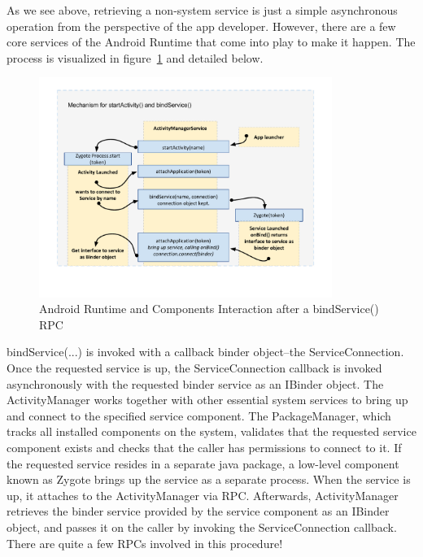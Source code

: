\documentclass[prodmode]{acmlarge}
\begin{document}
As we see above, retrieving a non-system service is just a simple asynchronous operation from the perspective of the app developer. However, there are a few core services of the Android Runtime that come into play to make it happen. The process is visualized in figure~\ref{fig:BindService} and detailed below.

\begin{figure}[h]
\centering
\includegraphics[width=0.85\textwidth]{drawings/bindService.pdf}
\caption{Android Runtime and Components Interaction after a bindService() RPC}
\label{fig:BindService}
\end{figure}

bindService(...) is invoked with a callback binder object--the ServiceConnection. Once the requested service is up, the ServiceConnection callback is invoked asynchronously with the requested binder service as an IBinder object. The ActivityManager works together with other essential system services to bring up and connect to the specified service component. The PackageManager, which tracks all installed components on the system, validates that the requested service component exists and checks that the caller has permissions to connect to it. If the requested service resides in a separate java package, a low-level component known as Zygote brings up the service as a separate process. When the service is up, it attaches to the ActivityManager via RPC. Afterwards, ActivityManager retrieves the binder service provided by the service component as an IBinder object, and passes it on the caller by invoking the ServiceConnection callback. There are quite a few RPCs involved in this procedure!
\end{document}
